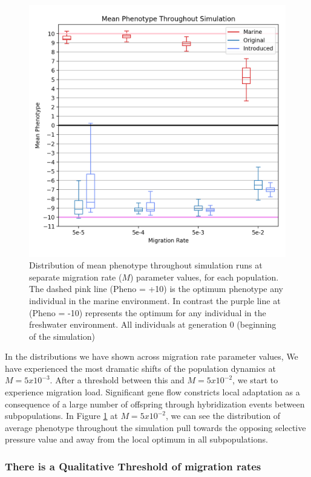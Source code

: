 \documentclass{article}
\begin{document}
\begin{figure}[h!tb]
	\begin{center}
  		\includegraphics[width=0.6\linewidth]{matplotlibPlots/MeanPhenotype1.png}
  		\caption{Distribution of mean phenotype throughout simulation runs at separate migration rate ($M$) parameter values, for each population.
		The dashed pink line (Pheno = +10) is the optimum phenotype any individual in the marine environment.
		In contrast the purple line at (Pheno = -10) represents the optimum for any individual in the freshwater environment. 
		All individuals at generation 0 (beginning of the simulation) 
		}
  		\label{fig:MeanPhenotype}
	\end{center}
\end{figure}


In the distributions we have shown across migration rate parameter values, 
We have experienced the most dramatic shifts of the population dynamics at $M = 5x10^{-3}$.
After a threshold between this and $M = 5x10^{-2}$, we start to experience migration load. 
Significant gene flow constricts local adaptation
as a consequence of a large number of offspring through hybridization events between subpopulations.
In Figure \ref{fig:MeanPhenotype} at $M = 5x10^{-2}$, we can see the distribution of average phenotype throughout the simulation
pull towards the opposing selective pressure value and away from the local optimum in all subpopulations.





	
\subsubsection*{There is a Qualitative Threshold of migration rates}
\end{document}
